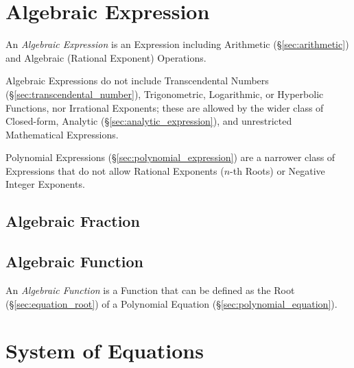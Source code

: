 \section{Algebraic Expression}\label{sec:algebraic_expression}

An \emph{Algebraic Expression} is an Expression including Arithmetic
(\S\ref{sec:arithmetic}) and Algebraic (Rational Exponent) Operations.

Algebraic Expressions do not include Transcendental Numbers
(\S\ref{sec:transcendental_number}), Trigonometric, Logarithmic, or Hyperbolic
Functions, nor Irrational Exponents; these are allowed by the wider class of
Closed-form, Analytic (\S\ref{sec:analytic_expression}), and unrestricted
Mathematical Expressions.

\fist Polynomial Expressions (\S\ref{sec:polynomial_expression}) are a narrower
class of Expressions that do not allow Rational Exponents ($n$-th Roots) or
Negative Integer Exponents.



\subsection{Algebraic Fraction}\label{sec:algebraic_fraction}

\subsection{Algebraic Function}\label{sec:algebraic_function}

An \emph{Algebraic Function} is a Function that can be defined as the Root
(\S\ref{sec:equation_root}) of a Polynomial Equation
(\S\ref{sec:polynomial_equation}).



\section{System of Equations}\label{sec:system_of_equations}

